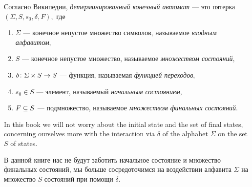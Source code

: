 \documentclass[../main/CT4S-EN-RU]{subfiles}
\begin{document}
\begin{blockRUS}
Согласно Википедии, \href{https://ru.wikipedia.org/wiki/%D0%9A%D0%BE%D0%BD%D0%B5%D1%87%D0%BD%D1%8B%D0%B9_%D0%B0%D0%B2%D1%82%D0%BE%D0%BC%D0%B0%D1%82#.D0.94.D0.B5.D1.82.D0.B5.D1.80.D0.BC.D0.B8.D0.BD.D0.B8.D1.80.D0.BE.D0.B2.D0.B0.D0.BD.D0.BD.D0.BE.D1.81.D1.82.D1.8C}{\em детерминированный конечный автомат} — это пятерка $(\Sigma,S,s_0,\delta,F),$ где
\begin{enumerate}
\item $\Sigma$ — конечное непустое множество символов, называемое {\em входным алфавитом},
\item $S$ — конечное непустое множество, называемое {\em множеством состояний},
\item $\delta\taking \Sigma\times S\to S$ — функция, называемая {\em функцией переходов},
\item $s_0\in S$ — элемент, называемый {\em начальным состоянием},
\item $F\ss S$ — подмножество, называемое {\em множеством финальных состояний}.
\end{enumerate}
\end{blockRUS}

\begin{blockENG}
In this book we will not worry about the initial state and the set of final states, concerning ourselves more with the interaction via $\delta$ of the alphabet $\Sigma$ on the set $S$ of states.
\end{blockENG}

\begin{blockRUS}
В данной книге нас не будут заботить начальное состояние и множество финальных состояний, мы больше сосредоточимся на воздействии алфавита $\Sigma$ на множество $S$ состояний при помощи $\delta$.
\end{blockRUS}
\end{document}
